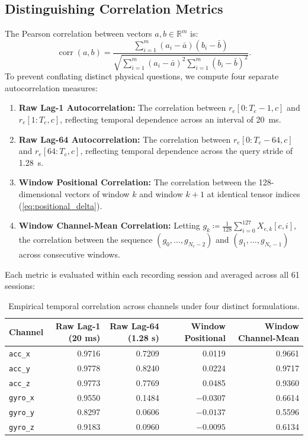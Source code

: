 \documentclass[11pt,a4paper]{article}
\newcommand{\R}{\mathbb R}
\newcommand{\code}[1]{{\small\ttfamily\nolinkurl{#1}}}
\theoremstyle{definition}
\begin{document}
\subsection{Distinguishing Correlation Metrics}
The Pearson correlation between vectors $a, b \in \R^m$ is:
\begin{equation}
\operatorname{corr}(a, b) = \frac{\sum_{i=1}^m (a_i - \bar{a})(b_i - \bar{b})}{\sqrt{\sum_{i=1}^m (a_i - \bar{a})^2 \sum_{i=1}^m (b_i - \bar{b})^2}}.
\end{equation}
To prevent conflating distinct physical questions, we compute four separate autocorrelation measures:
\begin{enumerate}
\item \textbf{Raw Lag-1 Autocorrelation:} The correlation between $r_e[0 : T_e - 1, c]$ and $r_e[1 : T_e, c]$, reflecting temporal dependence across an interval of 20~ms.
\item \textbf{Raw Lag-64 Autocorrelation:} The correlation between $r_e[0 : T_e - 64, c]$ and $r_e[64 : T_e, c]$, reflecting temporal dependence across the query stride of 1.28~s.
\item \textbf{Window Positional Correlation:} The correlation between the 128-dimensional vectors of window $k$ and window $k+1$ at identical tensor indices (\eqref{eq:positional_delta}).
\item \textbf{Window Channel-Mean Correlation:} Letting $g_k \coloneqq \frac{1}{128} \sum_{i=0}^{127} X_{e,k}[c, i]$, the correlation between the sequence $(g_0, \ldots, g_{N_e-2})$ and $(g_1, \ldots, g_{N_e-1})$ across consecutive windows.
\end{enumerate}

Each metric is evaluated within each recording session and averaged across all 61 sessions:

\begin{table}[htbp]\centering\small
\begin{tabular}{lrrrr}\toprule
Channel & Raw Lag-1 (20 ms) & Raw Lag-64 (1.28 s) & Window Positional & Window Channel-Mean\\\midrule
\code{acc_x} & 0.9716 & 0.7209 & 0.0119 & 0.9661\\
\code{acc_y} & 0.9778 & 0.8240 & 0.0224 & 0.9717\\
\code{acc_z} & 0.9773 & 0.7769 & 0.0485 & 0.9360\\
\code{gyro_x} & 0.9550 & 0.1484 & $-0.0307$ & 0.6614\\
\code{gyro_y} & 0.8297 & 0.0606 & $-0.0137$ & 0.5596\\
\code{gyro_z} & 0.9183 & 0.0960 & $-0.0095$ & 0.6134\\\bottomrule
\end{tabular}
\caption{Empirical temporal correlation across channels under four distinct formulations.}
\end{table}
\end{document}
